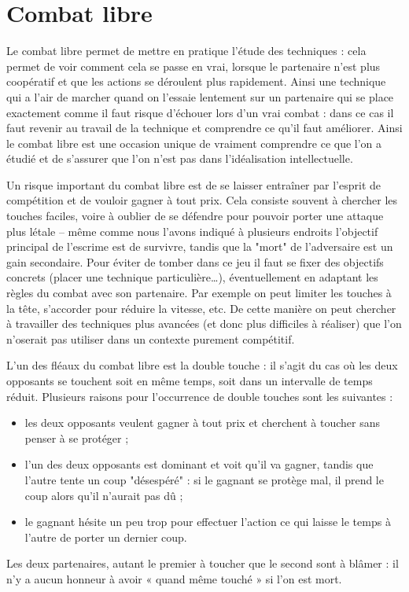 \chapter{Combat libre}



Le combat libre permet de mettre en pratique l'étude des techniques : cela permet de voir comment cela se passe en vrai, lorsque le partenaire n'est plus coopératif et que les actions se déroulent plus rapidement.
Ainsi une technique qui a l'air de marcher quand on l'essaie lentement sur un partenaire qui se place exactement comme il faut risque d'échouer lors d'un vrai combat : dans ce cas il faut revenir au travail de la technique et comprendre ce qu'il faut améliorer.
Ainsi le combat libre est une occasion unique de vraiment comprendre ce que l'on a étudié et de s'assurer que l'on n'est pas dans l'idéalisation intellectuelle.

Un risque important du combat libre est de se laisser entraîner par l'esprit de compétition et de vouloir gagner à tout prix.
Cela consiste souvent à chercher les touches faciles, voire à oublier de se défendre pour pouvoir porter une attaque plus létale -- même comme nous l'avons indiqué à plusieurs endroits l'objectif principal de l'escrime est de survivre, tandis que la "mort" de l'adversaire est un gain secondaire.
Pour éviter de tomber dans ce jeu il faut se fixer des objectifs concrets (placer une technique particulière…), éventuellement en adaptant les règles du combat avec son partenaire.
Par exemple on peut limiter les touches à la tête, s'accorder pour réduire la vitesse, etc.
De cette manière on peut chercher à travailler des techniques plus avancées (et donc plus difficiles à réaliser) que l'on n'oserait pas utiliser dans un contexte purement compétitif.

L'un des fléaux du combat libre est la double touche : il s'agit du cas où les deux opposants se touchent soit en même temps, soit dans un intervalle de temps réduit.
Plusieurs raisons pour l'occurrence de double touches sont les suivantes :
\begin{itemize}
	\item les deux opposants veulent gagner à tout prix et cherchent à toucher sans penser à se protéger ;
	
	\item l'un des deux opposants est dominant et voit qu'il va gagner, tandis que l'autre tente un coup "désespéré" : si le gagnant se protège mal, il prend le coup alors qu'il n'aurait pas dû ;
	
	\item le gagnant hésite un peu trop pour effectuer l'action ce qui laisse le temps à l'autre de porter un dernier coup.
\end{itemize}
Les deux partenaires, autant le premier à toucher que le second sont à blâmer : il n'y a aucun honneur à avoir « quand même touché » si l'on est mort.

